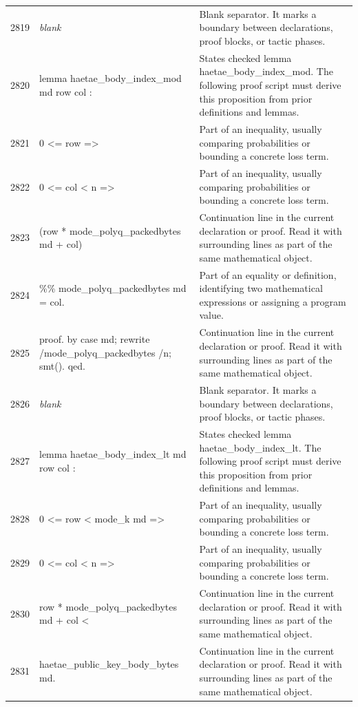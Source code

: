 \documentclass[10pt]{article}
\begin{document}
\begin{longtable}{r L{0.53\textwidth} L{0.37\textwidth}}
2819 & {\ttfamily\scriptsize \emph{blank}} & Blank separator.  It marks a boundary between declarations, proof blocks, or tactic phases. \\
2820 & {\ttfamily\scriptsize lemma haetae\_body\_index\_mod md row col :} & States checked lemma haetae\_body\_index\_mod.  The following proof script must derive this proposition from prior definitions and lemmas. \\
2821 & {\ttfamily\scriptsize   0 <= row =>} & Part of an inequality, usually comparing probabilities or bounding a concrete loss term. \\
2822 & {\ttfamily\scriptsize   0 <= col < n =>} & Part of an inequality, usually comparing probabilities or bounding a concrete loss term. \\
2823 & {\ttfamily\scriptsize   (row * mode\_polyq\_packedbytes md + col)} & Continuation line in the current declaration or proof.  Read it with surrounding lines as part of the same mathematical object. \\
2824 & {\ttfamily\scriptsize     \%\% mode\_polyq\_packedbytes md = col.} & Part of an equality or definition, identifying two mathematical expressions or assigning a program value. \\
2825 & {\ttfamily\scriptsize proof. by case md; rewrite /mode\_polyq\_packedbytes /n; smt(). qed.} & Continuation line in the current declaration or proof.  Read it with surrounding lines as part of the same mathematical object. \\
2826 & {\ttfamily\scriptsize \emph{blank}} & Blank separator.  It marks a boundary between declarations, proof blocks, or tactic phases. \\
2827 & {\ttfamily\scriptsize lemma haetae\_body\_index\_lt md row col :} & States checked lemma haetae\_body\_index\_lt.  The following proof script must derive this proposition from prior definitions and lemmas. \\
2828 & {\ttfamily\scriptsize   0 <= row < mode\_k md =>} & Part of an inequality, usually comparing probabilities or bounding a concrete loss term. \\
2829 & {\ttfamily\scriptsize   0 <= col < n =>} & Part of an inequality, usually comparing probabilities or bounding a concrete loss term. \\
2830 & {\ttfamily\scriptsize   row * mode\_polyq\_packedbytes md + col <} & Continuation line in the current declaration or proof.  Read it with surrounding lines as part of the same mathematical object. \\
2831 & {\ttfamily\scriptsize     haetae\_public\_key\_body\_bytes md.} & Continuation line in the current declaration or proof.  Read it with surrounding lines as part of the same mathematical object. \\

\end{longtable}
\end{document}
